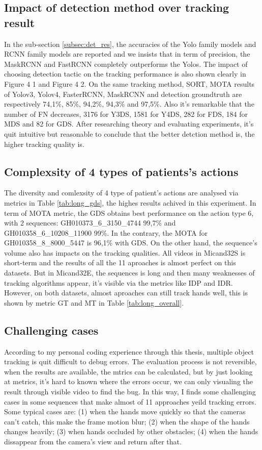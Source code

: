 \subsection{Impact of detection method over tracking result}
In the sub-section \ref{subsec:det_res}, the accuracies of the Yolo family models and RCNN family models are reported and we insists that in term of precision, the MaskRCNN and FastRCNN completely outperforms the Yolos. The impact of choosing detection tactic on the tracking performance is also shown clearly in Figure 4 1 and Figure 4 2. On the same tracking method, SORT, MOTA results of Yolov3, Yolov4, FasterRCNN, MaskRCNN and detection groundtruth are respectively 74,1\%, 85\%, 94,2\%, 94,3\% and 97,5\%. Also it’s remarkable that the number of FN decreases, 3176 for Y3DS, 1581 for Y4DS, 282 for FDS, 184 for MDS and 82 for GDS. 
After researching theory and evaluating experiments, it’s quit intuitive but reasonable to conclude that the better detction method is, the higher tracking quality is.
\subsection{Complexsity of 4 types of patients's actions}
The diversity and comlexsity of 4 type of patient’s actions are analysed via metrics in Table \ref{tab:long_gds}, the highes results achived in this experiment. In term of MOTA metric, the GDS obtains best performance on the action type 6, with 2 sequences:  GH010373\_6\_3150\_4744 99,7\% and GH010358\_6\_10208\_11900 99\%. In the contrary, the MOTA for GH010358\_8\_8000\_5447 is 96,1\% with GDS.
On the other hand, the sequence’s volume also has impacts on the tracking qualities. All videos in Micand32S is short-term and the results of all the 11 aproaches is almost perfect on this datasets. But in Micand32E, the sequences is long and then many weaknesses of tracking algorithms appear, it’s visible via the metrics like IDP and IDR. However, on both datasets, almost aproaches can still track hands well, this is shown by metric GT and MT in Table \ref{tab:long_overall}.
\subsection{Challenging cases}
According to my personal coding experience through this thesis, multiple object tracking is quit difficult to debug errors. The evaluation process is not reversible, when the results are available, the mtrics can be calculated, but by just looking at metrics, it’s hard to known where the errors occur, we can only visualing the result through visible video to find the bug. In this way, I finds some challenging cases in some sequences that make almost of 11 approaches yeild tracking errors. Some typical cases are: (1) when the hands move quickly so that the cameras can’t catch, this make the frame motion blur; (2) when the shape of the hands changes heavily; (3) when hands occluded by other obstacles; (4) when the hands dissappear from the camera’s view and return after that.